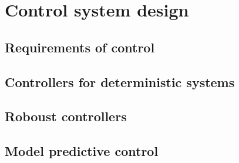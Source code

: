 \section{Control system design}

\subsection{Requirements of control}

\subsection{Controllers for deterministic systems}

\subsection{Roboust controllers}

\subsection{Model predictive control}